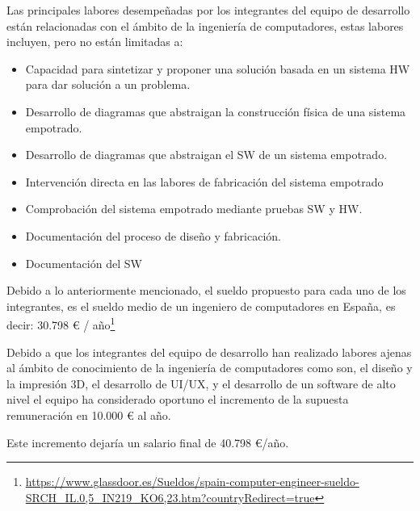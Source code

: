 Las principales labores desempeñadas por los integrantes del equipo de desarrollo están relacionadas con el ámbito de la ingeniería de computadores, estas labores incluyen, pero no están limitadas a:

\begin{itemize}
    \item Capacidad para sintetizar y proponer una solución basada en un sistema \ac{HW} para dar solución a un problema.
    \item Desarrollo de diagramas que abstraigan la construcción física de una sistema empotrado.
    \item Desarrollo de diagramas que abstraigan el \ac{SW} de un sistema empotrado.
    \item Intervención directa en las labores de fabricación del sistema empotrado
    \item Comprobación del sistema empotrado mediante pruebas \ac{SW} y \ac{HW}.
    \item Documentación del proceso de diseño y fabricación.
    \item Documentación del \ac{SW}
\end{itemize}

Debido a lo anteriormente mencionado, el sueldo propuesto para cada uno de los integrantes, es el sueldo medio de un ingeniero de computadores en España, es decir: 30.798 € / año\footnote{\url{https://www.glassdoor.es/Sueldos/spain-computer-engineer-sueldo-SRCH_IL.0,5_IN219_KO6,23.htm?countryRedirect=true}}

Debido a que los integrantes del equipo de desarrollo han realizado labores ajenas al ámbito de conocimiento de la ingeniería de computadores como son, el diseño y la impresión 3D, el desarrollo de UI/UX, y el desarrollo de un software de alto nivel el equipo ha considerado oportuno el incremento de la supuesta remuneración en 10.000 € al año.

Este incremento dejaría un salario final de 40.798 €/año.